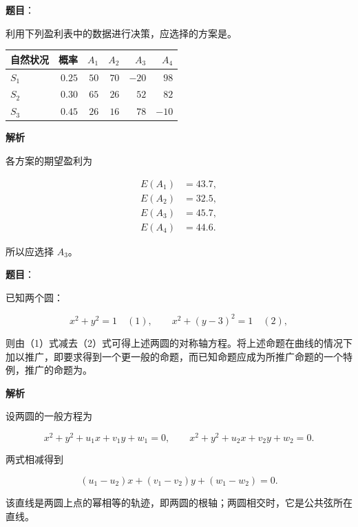 \begin{answer}

\textbf{题目}：

利用下列盈利表中的数据进行决策，应选择的方案是\gkblank{}。

\begin{center}
\begin{tabular}{lrrrrr}
\toprule
自然状况 & 概率 & $A_1$ & $A_2$ & $A_3$ & $A_4$ \\
\midrule
$S_1$ & $0.25$ & $50$ & $70$ & $-20$ & $98$ \\
$S_2$ & $0.30$ & $65$ & $26$ & $52$ & $82$ \\
$S_3$ & $0.45$ & $26$ & $16$ & $78$ & $-10$ \\
\bottomrule
\end{tabular}
\end{center}

\textbf{解析}

各方案的期望盈利为

\nopagebreak[4]
\[
\begin{aligned}
E(A_1)&=43.7,\\
E(A_2)&=32.5,\\
E(A_3)&=45.7,\\
E(A_4)&=44.6.
\end{aligned}
\]

所以应选择 $A_3$。


\end{answer}
\begin{answer}

\textbf{题目}：

已知两个圆：

\nopagebreak[4]
\[
x^2+y^2=1\quad(1),\qquad x^2+(y-3)^2=1\quad(2),
\]

则由（1）式减去（2）式可得上述两圆的对称轴方程。将上述命题在曲线的情况下加以推广，即要求得到一个更一般的命题，而已知命题应成为所推广命题的一个特例，推广的命题为\gkblank{}。

\textbf{解析}

设两圆的一般方程为

\nopagebreak[4]
\[
x^2+y^2+u_1x+v_1y+w_1=0,\qquad
x^2+y^2+u_2x+v_2y+w_2=0.
\]

两式相减得到

\nopagebreak[4]
\[
(u_1-u_2)x+(v_1-v_2)y+(w_1-w_2)=0.
\]

该直线是两圆上点的幂相等的轨迹，即两圆的根轴；两圆相交时，它是公共弦所在直线。


\end{answer}
